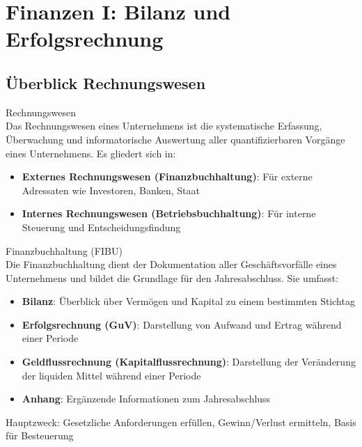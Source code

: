 \section{Finanzen I: Bilanz und Erfolgsrechnung}

\subsection{Überblick Rechnungswesen}

\begin{definition}{Rechnungswesen}\\
Das Rechnungswesen eines Unternehmens ist die systematische Erfassung, Überwachung und informatorische Auswertung aller quantifizierbaren Vorgänge eines Unternehmens. Es gliedert sich in:
\begin{itemize}
    \item \textbf{Externes Rechnungswesen (Finanzbuchhaltung)}: Für externe Adressaten wie Investoren, Banken, Staat
    \item \textbf{Internes Rechnungswesen (Betriebsbuchhaltung)}: Für interne Steuerung und Entscheidungsfindung
\end{itemize}
\end{definition}

\begin{concept}{Finanzbuchhaltung (FIBU)}\\
Die Finanzbuchhaltung dient der Dokumentation aller Geschäftsvorfälle eines Unternehmens und bildet die Grundlage für den Jahresabschluss. Sie umfasst:
\begin{itemize}
    \item \textbf{Bilanz}: Überblick über Vermögen und Kapital zu einem bestimmten Stichtag
    \item \textbf{Erfolgsrechnung (GuV)}: Darstellung von Aufwand und Ertrag während einer Periode
    \item \textbf{Geldflussrechnung (Kapitalflussrechnung)}: Darstellung der Veränderung der liquiden Mittel während einer Periode
    \item \textbf{Anhang}: Ergänzende Informationen zum Jahresabschluss
\end{itemize}
Hauptzweck: Gesetzliche Anforderungen erfüllen, Gewinn/Verlust ermitteln, Basis für Besteuerung
\end{concept}

